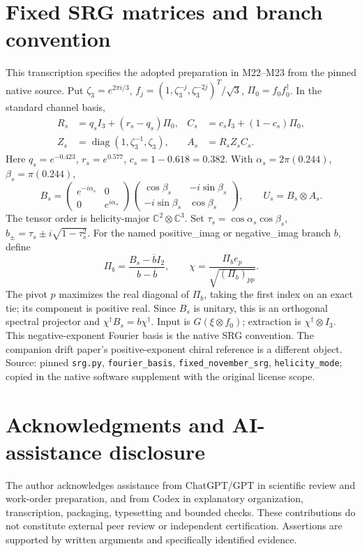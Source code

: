 \documentclass[11pt,a4paper]{article}
\begin{document}
\section{Fixed SRG matrices and branch convention}
This transcription specifies the adopted preparation in M22--M23 from the pinned native source. Put \(\zeta_3=e^{2\pi i/3}\), \(f_j=(1,\zeta_3^{-j},\zeta_3^{-2j})^T/\sqrt3\), \(\Pi_0=f_0f_0^\dagger\). In the standard channel basis,
\[
\begin{aligned}
R_s&=q_s I_3+(r_s-q_s)\Pi_0,& C_s&=c_s I_3+(1-c_s)\Pi_0,\\
Z_s&=\operatorname{diag}(1,\zeta_3^{-1},\zeta_3),& A_s&=R_sZ_sC_s .
\end{aligned}
\]
Here \(q_s=e^{-0.423}\), \(r_s=e^{0.577}\), \(c_s=1-0.618=0.382\). With \(\alpha_s=2\pi(0.244)\), \(\beta_s=\pi(0.244)\),
\[
B_s=\begin{pmatrix}e^{-i\alpha_s}&0\\0&e^{i\alpha_s}\end{pmatrix}
\begin{pmatrix}\cos\beta_s&-i\sin\beta_s\\-i\sin\beta_s&\cos\beta_s\end{pmatrix},
\qquad U_s=B_s\otimes A_s .
\]
The tensor order is helicity-major \(\mathbb C^2\otimes\mathbb C^3\).
Set \(\tau_s=\cos\alpha_s\cos\beta_s\), \(b_\pm=\tau_s\pm i\sqrt{1-\tau_s^2}\).
For the named positive\_imag or negative\_imag branch \(b\), define
\[
\Pi_b=\frac{B_s-\overline b I_2}{b-\overline b},\qquad
\chi=\frac{\Pi_b e_p}{\sqrt{(\Pi_b)_{pp}}}.
\]
The pivot \(p\) maximizes the real diagonal of \(\Pi_b\), taking the first index on an exact tie; its component is positive real. Since \(B_s\) is unitary, this is an orthogonal spectral projector and \(\chi^\dagger B_s=b\chi^\dagger\). Input is \(G(\xi\otimes f_0)\); extraction is \(\chi^\dagger\otimes I_3\).
This negative-exponent Fourier basis is the native SRG convention. The companion drift paper's positive-exponent chiral reference is a different object.
Source: pinned \texttt{srg.py}, \texttt{fourier\_basis}, \texttt{fixed\_november\_srg}, \texttt{helicity\_mode}; copied in the native software supplement with the original license scope.

\section*{Acknowledgments and AI-assistance disclosure}
The author acknowledges assistance from ChatGPT/GPT in scientific review and work-order preparation, and from Codex in explanatory organization, transcription, packaging, typesetting and bounded checks. These contributions do not constitute external peer review or independent certification. Assertions are supported by written arguments and specifically identified evidence.
\end{document}
